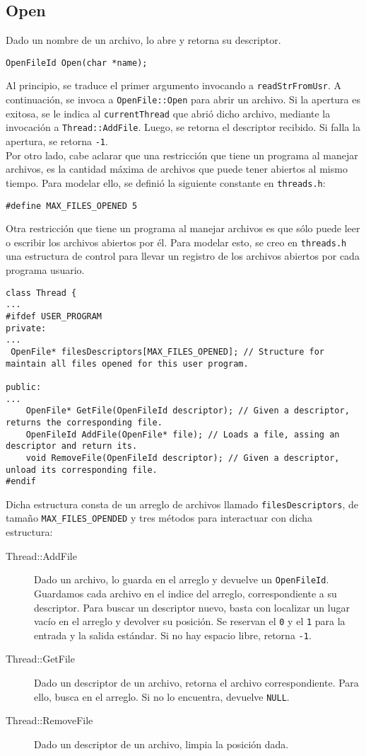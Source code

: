 \subsection*{Open}
Dado un nombre de un archivo, lo abre y retorna su descriptor.\\
\begin{lstlisting}[style=C]
OpenFileId Open(char *name);
\end{lstlisting}
Al principio, se traduce el primer argumento invocando a \texttt{readStrFromUsr}. A continuación, se invoca a \texttt{OpenFile::Open} para abrir un archivo. Si la apertura es exitosa, se le indica al \texttt{currentThread} que abrió dicho archivo, mediante la invocación a \texttt{Thread::AddFile}. Luego, se retorna el descriptor recibido. Si falla la apertura, se retorna \texttt{-1}.\\
Por otro lado, cabe aclarar que una restricción que tiene un programa al manejar archivos, es la cantidad máxima de archivos que puede tener abiertos al mismo tiempo. Para modelar ello, se definió la siguiente constante en \texttt{threads.h}:
\begin{lstlisting}[style=C]
#define MAX_FILES_OPENED 5
\end{lstlisting}
Otra restricción que tiene un programa al manejar archivos es que sólo puede leer o escribir los archivos abiertos por él. Para modelar esto, se creo en \texttt{threads.h} una estructura de control para llevar un registro de los archivos abiertos por cada programa usuario.
\begin{lstlisting}[style=C]
class Thread {
...
#ifdef USER_PROGRAM
private:
...
 OpenFile* filesDescriptors[MAX_FILES_OPENED]; // Structure for maintain all files opened for this user program.

public:
...
    OpenFile* GetFile(OpenFileId descriptor); // Given a descriptor, returns the corresponding file.
    OpenFileId AddFile(OpenFile* file); // Loads a file, assing an descriptor and return its.
    void RemoveFile(OpenFileId descriptor); // Given a descriptor, unload its corresponding file.
#endif
\end{lstlisting}
Dicha estructura consta de un arreglo de archivos llamado \texttt{filesDescriptors}, de tamaño \texttt{MAX\_FILES\_OPENDED} y tres métodos para interactuar con dicha estructura:
\begin{description}
    \item[Thread::AddFile] Dado un archivo, lo guarda en el arreglo y devuelve un \texttt{OpenFileId}. Guardamos cada archivo en el indice del arreglo, correspondiente a su descriptor. Para buscar un descriptor nuevo, basta con localizar un lugar vacío en el arreglo y devolver su posición. Se reservan el \texttt{0} y el \texttt{1} para la entrada y la salida estándar. Si no hay espacio libre, retorna \texttt{-1}.
    \item[Thread::GetFile] Dado un descriptor de un archivo, retorna el archivo correspondiente. Para ello, busca en el arreglo. Si no lo encuentra, devuelve \texttt{NULL}.
    \item[Thread::RemoveFile] Dado un descriptor de un archivo, limpia la posición dada.
\end{description}

